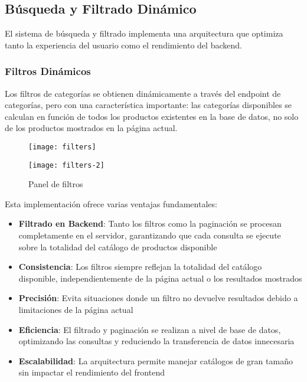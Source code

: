 \subsection{Búsqueda y Filtrado Dinámico}

El sistema de búsqueda y filtrado implementa una arquitectura que optimiza tanto la experiencia del usuario como el rendimiento del backend.

\subsubsection{Filtros Dinámicos}

Los filtros de categorías se obtienen dinámicamente a través del endpoint de categorías, pero con una característica importante: las categorías disponibles se calculan en función de todos los productos existentes en la base de datos, no solo de los productos mostrados en la página actual.

\begin{figure}[H]
    \centering
    \begin{minipage}{0.45\textwidth}
        \centering
        \texttt{[image: filters]}
    \end{minipage}
    \hfill
    \begin{minipage}{0.45\textwidth}
        \centering
        \texttt{[image: filters-2]}
    \end{minipage}
    \caption{Panel de filtros}
\end{figure}

Esta implementación ofrece varias ventajas fundamentales:

\begin{itemize}
    \item \textbf{Filtrado en Backend}: Tanto los filtros como la paginación se procesan completamente en el servidor, garantizando que cada consulta se ejecute sobre la totalidad del catálogo de productos disponible
    \item \textbf{Consistencia}: Los filtros siempre reflejan la totalidad del catálogo disponible, independientemente de la página actual o los resultados mostrados
    \item \textbf{Precisión}: Evita situaciones donde un filtro no devuelve resultados debido a limitaciones de la página actual
    \item \textbf{Eficiencia}: El filtrado y paginación se realizan a nivel de base de datos, optimizando las consultas y reduciendo la transferencia de datos innecesaria
    \item \textbf{Escalabilidad}: La arquitectura permite manejar catálogos de gran tamaño sin impactar el rendimiento del frontend
\end{itemize}

